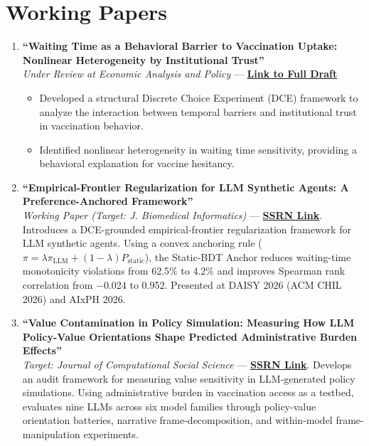 \documentclass[11pt, letterpaper]{article}
\begin{document}
\section*{Working Papers}
\begin{enumerate}
    \item \textbf{``Waiting Time as a Behavioral Barrier to Vaccination Uptake: Nonlinear Heterogeneity by Institutional Trust''} \\
    \textit{Under Review at Economic Analysis and Policy} --- \href{https://yichao2022.github.io/jmp.pdf}{\textbf{Link to Full Draft}}
    \begin{itemize}[noitemsep, topsep=0pt]
        \item Developed a structural Discrete Choice Experiment (DCE) framework to analyze the interaction between temporal barriers and institutional trust in vaccination behavior.
        \item Identified nonlinear heterogeneity in waiting time sensitivity, providing a behavioral explanation for vaccine hesitancy.
    \end{itemize}

    \item \textbf{``Empirical-Frontier Regularization for LLM Synthetic Agents: A Preference-Anchored Framework''} \\
    \textit{Working Paper (Target: J. Biomedical Informatics)} --- \href{https://papers.ssrn.com/sol3/papers.cfm?abstract_id=6686418}{\textbf{SSRN Link}}. Introduces a DCE-grounded empirical-frontier regularization framework for LLM synthetic agents. Using a convex anchoring rule ($\pi = \lambda \pi_{\mathrm{LLM}} + (1-\lambda) P_{\mathrm{static}}$), the Static-BDT Anchor reduces waiting-time monotonicity violations from 62.5\% to 4.2\% and improves Spearman rank correlation from $-$0.024 to 0.952. Presented at DAISY 2026 (ACM CHIL 2026) and AIxPH 2026.

    \item \textbf{``Value Contamination in Policy Simulation: Measuring How LLM Policy-Value Orientations Shape Predicted Administrative Burden Effects''} \\
    \textit{Target: Journal of Computational Social Science} --- \href{https://papers.ssrn.com/sol3/papers.cfm?abstract_id=6876161}{\textbf{SSRN Link}}. Develops an audit framework for measuring value sensitivity in LLM-generated policy simulations. Using administrative burden in vaccination access as a testbed, evaluates nine LLMs across six model families through policy-value orientation batteries, narrative frame-decomposition, and within-model frame-manipulation experiments.


\end{enumerate}
\end{document}
